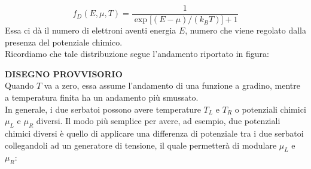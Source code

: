 \begin{equation}
    f_D(E,\mu,T)
    = \frac{1}{\exp \bigl[ (E - \mu)/(k_B T) \bigr] + 1}
    \label{eq:distribuzione_Fermi-Dirac}
\end{equation}
Essa ci dà il numero di elettroni aventi energia $E$, numero che viene regolato dalla presenza del potenziale chimico.\\
Ricordiamo che tale distribuzione segue l'andamento riportato in figura:
\begin{figure}[H]
    \centering
\end{figure}
\textbf{DISEGNO PROVVISORIO}\\
Quando $T$ va a zero, essa assume l'andamento di una funzione a gradino, mentre a temperatura finita ha un andamento più smussato.\\
In generale, i due serbatoi possono avere temperature $T_L$ e $T_R$ o potenziali chimici $\mu_L$ e $\mu_R$ diversi. Il modo più semplice per avere, ad esempio, due potenziali chimici diversi è quello di applicare una differenza di potenziale tra i due serbatoi collegandoli ad un generatore di tensione, il quale permetterà di modulare $\mu_L$ e $\mu_R$:
